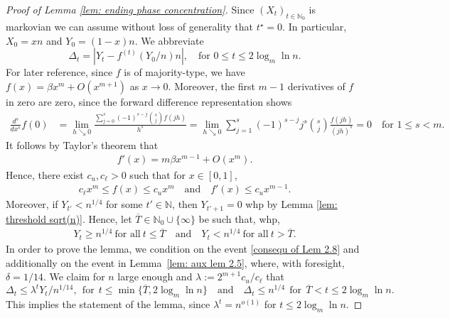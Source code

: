 \documentclass[11pt]{article}
\numberwithin{theorem}{section}
\begin{document}
\begin{proof}[Proof of Lemma \ref{lem: ending phase concentration}]
Since $(X_t)_{t\in \mathbb{N}_0}$ is markovian we can assume without loss of generality that $t^\star = 0$. In particular, $X_0 = xn$ and $Y_0 = (1-x)n$.
We abbreviate
\[
    \Delta_{t} = \left|Y_{t} - f^{(t)}(Y_0/n)n \right|,
    \quad\text{for } 0 \le t \le 2 \log_m\ln n.
\]
For later reference, since $f$ is of majority-type, we have $f(x)=\beta x^m + O(x^{m+1})$ as $x\to 0$. Moreover, the first $m-1$ derivatives of $f$ in zero are zero, since the forward difference representation shows
\begin{align*}
    \frac{d^s}{dx^s} f (0) &= \lim_{h\searrow 0} \frac{\sum_{j=0}^{s} (-1)^{s-j}\binom{s}{j}f(jh)}{h^s} = \lim_{h\searrow 0} \sum_{j=1}^{s} (-1)^{s-j} j^s \binom{s}{j} \frac{f(jh)}{(jh)^s} = 0 
    \quad\text{for }
    1\leq s <m.
\end{align*}
It follows by Taylor's theorem that
\begin{align}\label{equ: formula derivative}
    f'(x)=m\beta x^{m-1} + O(x^{m}).
\end{align}
Hence, there exist $c_u,c_\ell>0$ such that for $x\in[0,1]$,
\begin{align}\label{inequ: f upper lower x^m}
    c_\ell x^m \leq f(x) \leq c_ux^m
    \quad\text{and}\quad
    f'(x)\leq c_ux^{m-1}.
\end{align}
Moreover, if $Y_{t'} < n^{1/4}$ for some $t' \in \mathbb{N}$, then $Y_{t'+1} =0$ whp by Lemma \ref{lem: threshold sqrt(n)}. Hence, let $\overline{T} \in \mathbb{N}_0 \cup \{\infty\}$ be such that, whp,
\begin{align}\label{consequ of Lem 2.8}
    Y_{t} \geq n^{1/4} ~ \text{for all} ~  t\leq \overline{T}
    \quad \text{and} \quad
    Y_{t} < n^{1/4} ~ \text{for all} ~  t > \overline{T}.
\end{align}
In order to prove the lemma, we condition
on the event \eqref{consequ of Lem 2.8} and additionally
on the event in Lemma~\ref{lem: aux lem 2.5}, where, with foresight, $\delta=1/14$. We claim for $n$ large enough and $\lambda:=2^{m+1}c_u/c_\ell$ that
\begin{equation}
\label{eq:boundD_t}
    \Delta_t \leq \lambda^tY_t/n^{1/14},
    ~~\text{for}~~
    t\leq \min\{\overline{T}, 2\log_m\ln n\}
    \quad\text{and}\quad
    \Delta_{t} \leq n^{1/4}
    ~~\text{for}~~
    \overline{T} < t \le 2\log_m\ln n .
\end{equation}
This implies the statement of the lemma, since $\lambda^t = n^{o(1)}$ for $t \leq 2 \log_m \ln n$.

\end{proof}
\end{document}
